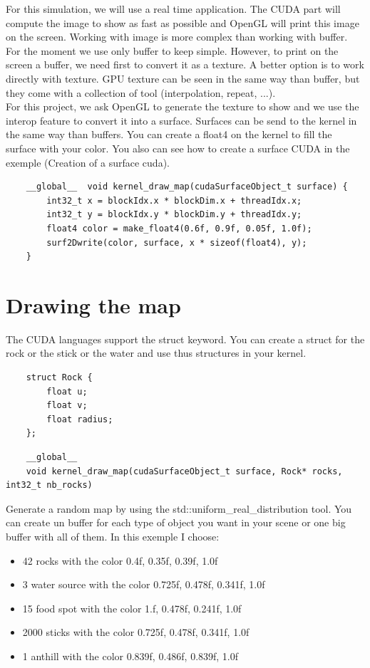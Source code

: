 \documentclass{article}
\begin{document}
For this simulation, we will use a real time application. The CUDA part will compute the image to show as fast as possible and OpenGL will print this image on the screen. Working with image is more complex than working with buffer. For the moment we use only buffer to keep simple. However, to print on the screen a buffer, we need first to convert it as a texture. A better option is to work directly with texture. GPU texture can be seen in the same way than buffer, but they come with a collection of tool (interpolation, repeat, ...).\\
For this project, we ask OpenGL to generate the texture to show and we use the interop feature to convert it into a surface. Surfaces can be send to the kernel in the same way than buffers. You can create a float4 on the kernel to fill the surface with your color. You also can see how to create a surface CUDA in the exemple (Creation of a surface cuda).
\begin{lstlisting}
	__global__  void kernel_draw_map(cudaSurfaceObject_t surface) {
		int32_t x = blockIdx.x * blockDim.x + threadIdx.x;
		int32_t y = blockIdx.y * blockDim.y + threadIdx.y;
		float4 color = make_float4(0.6f, 0.9f, 0.05f, 1.0f);
		surf2Dwrite(color, surface, x * sizeof(float4), y);
	}
\end{lstlisting}

\section{Drawing the map}
The CUDA languages support the struct keyword. You can create a struct for the rock or the stick or the water and use thus structures in your kernel.
\begin{lstlisting}
	struct Rock {
		float u;
		float v;
		float radius;
	};
\end{lstlisting}
\begin{lstlisting}
	__global__ 
	void kernel_draw_map(cudaSurfaceObject_t surface, Rock* rocks, int32_t nb_rocks)
\end{lstlisting}
Generate a random map by using the std::uniform\_real\_distribution tool. You can create un buffer for each type of object you want in your scene or one big buffer with all of them. In this exemple I choose:
\begin{itemize}
	\item 42 rocks with the color 0.4f, 0.35f, 0.39f, 1.0f
\item 3 water source with the color 0.725f, 0.478f, 0.341f, 1.0f
\item 15 food spot with the color 1.f, 0.478f, 0.241f, 1.0f
\item 2000 sticks with the color 0.725f, 0.478f, 0.341f, 1.0f
\item 1 anthill with the color 0.839f, 0.486f, 0.839f, 1.0f
\end{itemize}
\end{document}
